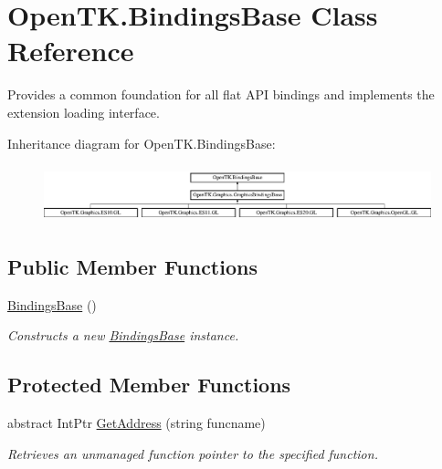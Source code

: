 \hypertarget{class_open_t_k_1_1_bindings_base}{\section{Open\-T\-K.\-Bindings\-Base Class Reference}
\label{class_open_t_k_1_1_bindings_base}
}


Provides a common foundation for all flat A\-P\-I bindings and implements the extension loading interface.  


Inheritance diagram for Open\-T\-K.\-Bindings\-Base\-:\begin{figure}[H]
\begin{center}
\leavevmode
\includegraphics[height=1.666667cm]{class_open_t_k_1_1_bindings_base}
\end{center}
\end{figure}
\subsection*{Public Member Functions}
\begin{DoxyCompactItemize}
\item 
\hyperlink{class_open_t_k_1_1_bindings_base_afb1707c7e4ecb51abcebf7623e783da3}{Bindings\-Base} ()
\begin{DoxyCompactList}\small\item\em Constructs a new \hyperlink{class_open_t_k_1_1_bindings_base}{Bindings\-Base} instance. \end{DoxyCompactList}\end{DoxyCompactItemize}
\subsection*{Protected Member Functions}
\begin{DoxyCompactItemize}
\item 
abstract Int\-Ptr \hyperlink{class_open_t_k_1_1_bindings_base_a1eaa8a8b7a6a86051468535d38fca81c}{Get\-Address} (string funcname)
\begin{DoxyCompactList}\small\item\em Retrieves an unmanaged function pointer to the specified function. \end{DoxyCompactList}\end{DoxyCompactItemize}
